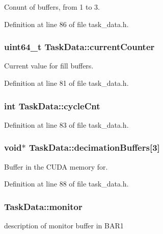 Conunt of buffers, from 1 to 3. 

Definition at line 86 of file task\_\-data.h.\hypertarget{structTaskData_ab036e756a3cc0a6570d137a564fc3b85}{
\subsubsection[{currentCounter}]{\setlength{\rightskip}{0pt plus 5cm}uint64\_\-t {\bf TaskData::currentCounter}}}
\label{structTaskData_ab036e756a3cc0a6570d137a564fc3b85}


Current value for fill buffers. 

Definition at line 81 of file task\_\-data.h.\hypertarget{structTaskData_aa4e4e2414770aff4a16fcb5b0814ddeb}{
\subsubsection[{cycleCnt}]{\setlength{\rightskip}{0pt plus 5cm}int {\bf TaskData::cycleCnt}}}
\label{structTaskData_aa4e4e2414770aff4a16fcb5b0814ddeb}


Definition at line 83 of file task\_\-data.h.\hypertarget{structTaskData_a9b8b05530ea3fea70aebedc097603982}{
\subsubsection[{decimationBuffers}]{\setlength{\rightskip}{0pt plus 5cm}void$\ast$ {\bf TaskData::decimationBuffers}\mbox{[}3\mbox{]}}}
\label{structTaskData_a9b8b05530ea3fea70aebedc097603982}


Buffer in the CUDA memory for. 

Definition at line 88 of file task\_\-data.h.\hypertarget{structTaskData_a0d4636beee666900987f3ed81e096d09}{
\subsubsection[{monitor}]{ {\bf TaskData::monitor}}}
\label{structTaskData_a0d4636beee666900987f3ed81e096d09}


description of monitor buffer in BAR1 

